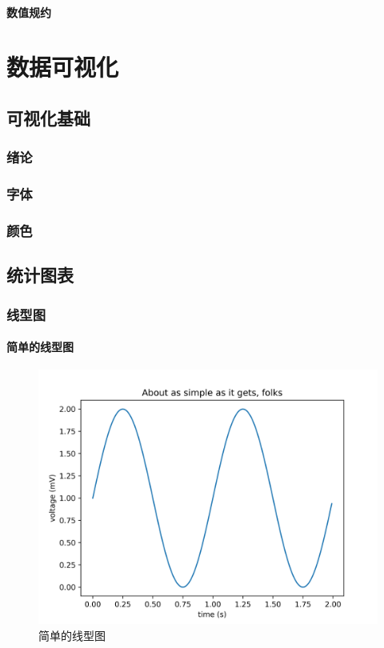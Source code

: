 \documentclass[openany]{progbookcn}
\begin{document}
\subsection{数值规约}

\part{数据可视化}
\chapter{可视化基础}
\section{绪论}
\section{字体}
\section{颜色}
\chapter{统计图表}
\section{线型图}
\subsection{简单的线型图}

\begin{figure}[H]
\centering
\includegraphics[width=0.6 \textwidth]{figs/chapter24/lines/SimpleLine}
\caption{简单的线型图}
\end{figure}
\end{document}
